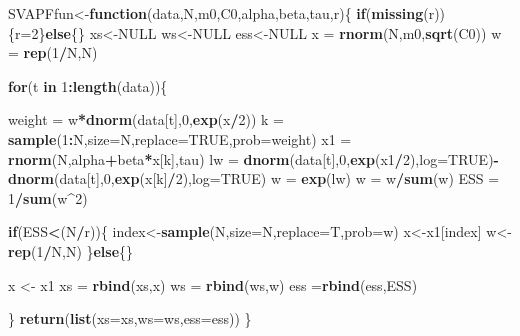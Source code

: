 \documentclass[
]{book}
\newenvironment{Shaded}{\begin{snugshade}}{\end{snugshade}}
\newcommand{\ControlFlowTok}[1]{\textcolor[rgb]{0.13,0.29,0.53}{\textbf{#1}}}
\newcommand{\DataTypeTok}[1]{\textcolor[rgb]{0.13,0.29,0.53}{#1}}
\newcommand{\DecValTok}[1]{\textcolor[rgb]{0.00,0.00,0.81}{#1}}
\newcommand{\KeywordTok}[1]{\textcolor[rgb]{0.13,0.29,0.53}{\textbf{#1}}}
\newcommand{\NormalTok}[1]{#1}
\newcommand{\OperatorTok}[1]{\textcolor[rgb]{0.81,0.36,0.00}{\textbf{#1}}}
\newcommand{\OtherTok}[1]{\textcolor[rgb]{0.56,0.35,0.01}{#1}}
\newcommand{\StringTok}[1]{\textcolor[rgb]{0.31,0.60,0.02}{#1}}
\theoremstyle{break}
\theoremstyle{nonumberplain}
\begin{document}
\begin{Shaded}
\begin{Highlighting}[]
\NormalTok{SVAPFfun<-}\ControlFlowTok{function}\NormalTok{(data,N,m0,C0,alpha,beta,tau,r)\{}
  \ControlFlowTok{if}\NormalTok{(}\KeywordTok{missing}\NormalTok{(r))\{r=}\DecValTok{2}\NormalTok{\}}\ControlFlowTok{else}\NormalTok{\{\}}
\NormalTok{  xs<-}\OtherTok{NULL}
\NormalTok{  ws<-}\OtherTok{NULL}
\NormalTok{  ess<-}\OtherTok{NULL}
\NormalTok{  x  =}\StringTok{ }\KeywordTok{rnorm}\NormalTok{(N,m0,}\KeywordTok{sqrt}\NormalTok{(C0))}
\NormalTok{  w  =}\StringTok{ }\KeywordTok{rep}\NormalTok{(}\DecValTok{1}\OperatorTok{/}\NormalTok{N,N)}
  
  \ControlFlowTok{for}\NormalTok{(t }\ControlFlowTok{in} \DecValTok{1}\OperatorTok{:}\KeywordTok{length}\NormalTok{(data))\{}
    
\NormalTok{    weight =}\StringTok{ }\NormalTok{w}\OperatorTok{*}\KeywordTok{dnorm}\NormalTok{(data[t],}\DecValTok{0}\NormalTok{,}\KeywordTok{exp}\NormalTok{(x}\OperatorTok{/}\DecValTok{2}\NormalTok{))}
\NormalTok{    k   =}\StringTok{ }\KeywordTok{sample}\NormalTok{(}\DecValTok{1}\OperatorTok{:}\NormalTok{N,}\DataTypeTok{size=}\NormalTok{N,}\DataTypeTok{replace=}\OtherTok{TRUE}\NormalTok{,}\DataTypeTok{prob=}\NormalTok{weight)}
\NormalTok{    x1   =}\StringTok{ }\KeywordTok{rnorm}\NormalTok{(N,alpha}\OperatorTok{+}\NormalTok{beta}\OperatorTok{*}\NormalTok{x[k],tau)}
\NormalTok{    lw  =}\StringTok{ }\KeywordTok{dnorm}\NormalTok{(data[t],}\DecValTok{0}\NormalTok{,}\KeywordTok{exp}\NormalTok{(x1}\OperatorTok{/}\DecValTok{2}\NormalTok{),}\DataTypeTok{log=}\OtherTok{TRUE}\NormalTok{)}\OperatorTok{-}\KeywordTok{dnorm}\NormalTok{(data[t],}\DecValTok{0}\NormalTok{,}\KeywordTok{exp}\NormalTok{(x[k]}\OperatorTok{/}\DecValTok{2}\NormalTok{),}\DataTypeTok{log=}\OtherTok{TRUE}\NormalTok{)}
\NormalTok{    w   =}\StringTok{ }\KeywordTok{exp}\NormalTok{(lw)}
\NormalTok{    w   =}\StringTok{ }\NormalTok{w}\OperatorTok{/}\KeywordTok{sum}\NormalTok{(w)}
\NormalTok{    ESS  =}\StringTok{ }\DecValTok{1}\OperatorTok{/}\KeywordTok{sum}\NormalTok{(w}\OperatorTok{^}\DecValTok{2}\NormalTok{)}
    
    \ControlFlowTok{if}\NormalTok{(ESS}\OperatorTok{<}\NormalTok{(N}\OperatorTok{/}\NormalTok{r))\{}
\NormalTok{      index<-}\KeywordTok{sample}\NormalTok{(N,}\DataTypeTok{size=}\NormalTok{N,}\DataTypeTok{replace=}\NormalTok{T,}\DataTypeTok{prob=}\NormalTok{w)}
\NormalTok{      x<-x1[index]}
\NormalTok{      w<-}\KeywordTok{rep}\NormalTok{(}\DecValTok{1}\OperatorTok{/}\NormalTok{N,N)}
\NormalTok{    \}}\ControlFlowTok{else}\NormalTok{\{\}}
    
\NormalTok{    x <-}\StringTok{ }\NormalTok{x1}
\NormalTok{    xs =}\StringTok{ }\KeywordTok{rbind}\NormalTok{(xs,x)}
\NormalTok{    ws =}\StringTok{ }\KeywordTok{rbind}\NormalTok{(ws,w)}
\NormalTok{    ess =}\KeywordTok{rbind}\NormalTok{(ess,ESS)}
    
\NormalTok{  \}}
  \KeywordTok{return}\NormalTok{(}\KeywordTok{list}\NormalTok{(}\DataTypeTok{xs=}\NormalTok{xs,}\DataTypeTok{ws=}\NormalTok{ws,}\DataTypeTok{ess=}\NormalTok{ess))}
\NormalTok{\}}
\end{Highlighting}
\end{Shaded}
\end{document}
